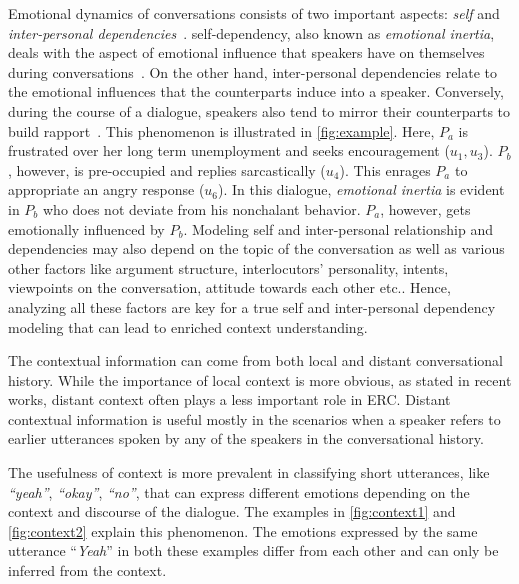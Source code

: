 \documentclass{IEEEtran}\usepackage[pdftex]{graphicx}
\begin{document}
	Emotional dynamics of conversations consists of two important aspects: \textit{self} and \textit{inter-personal dependencies}~\citep{morris2000emotions}. self-dependency, also known as \textit{emotional inertia}, deals with the aspect of emotional influence that speakers have on themselves during conversations~\citep{kuppens2010emotional}. 
	On the other hand, inter-personal dependencies relate to the emotional influences that the counterparts induce into a speaker. Conversely, during the course of a dialogue, speakers also tend to mirror their counterparts to build rapport~\citep{navarretta2016mirroring}. This phenomenon is illustrated in \cref{fig:example}. Here, $P_a$ is frustrated over her long term unemployment and seeks encouragement ($u_1, u_3$). $P_b$, however, is pre-occupied and replies sarcastically ($u_4$). This enrages $P_a$ to appropriate an angry response ($u_6$). In this dialogue, \textit{emotional inertia} is evident in $P_b$ who does not deviate from his nonchalant behavior. $P_a$, however, gets emotionally influenced by $P_b$. Modeling self and inter-personal relationship and dependencies may also depend on the topic of the conversation as well as various other factors like argument structure, interlocutors’ personality, intents, viewpoints on the conversation, attitude towards each other etc.. Hence, analyzing all these factors are key for a true self and inter-personal dependency modeling that can lead to enriched context understanding. 
	
	The contextual information can come from both local and distant conversational history. While the importance of local context is more obvious, as stated in  recent works, distant context often plays a less important role in ERC. Distant contextual information is useful mostly in the scenarios when a speaker refers to earlier utterances spoken by any of the speakers in the conversational history.
	
	The usefulness of context is more prevalent in classifying short utterances, like {\it ``yeah''}, {\it ``okay''}, {\it ``no''}, that
	can express different emotions depending on the context and discourse of the dialogue. The examples in \cref{fig:context1} and \cref{fig:context2} explain this phenomenon. The emotions expressed by the same utterance ``\emph{Yeah}'' in both these examples differ from each other and can only be inferred from the context. 
	
\end{document}
